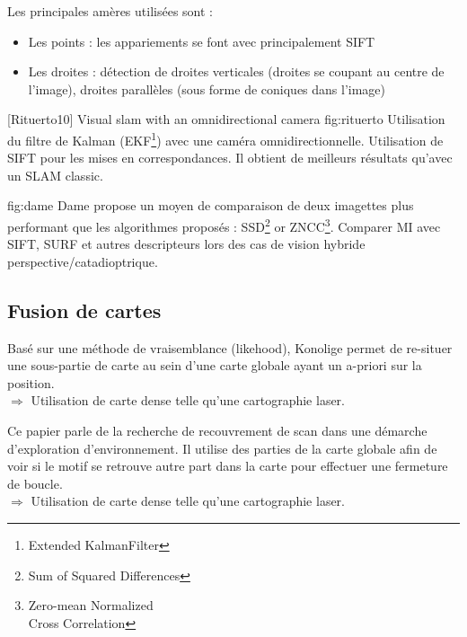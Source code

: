 
Les principales amères utilisées sont :
\begin{itemize}
\item Les points : les appariements se font avec principalement SIFT
\item Les droites : détection de droites verticales (droites se coupant au centre de l'image), droites parallèles (sous forme de coniques dans l'image)
\end{itemize}



 {[Rituerto10] Visual slam with an omnidirectional camera} {fig:rituerto}
Utilisation du filtre de Kalman (EKF\footnote{Extended KalmanFilter}) avec une caméra omnidirectionnelle. Utilisation de SIFT pour les mises en correspondances. Il obtient de meilleurs résultats qu'avec un SLAM classic. 



 {fig:dame}
Dame propose un moyen de comparaison de deux imagettes plus performant que les algorithmes proposés : SSD\footnote{Sum of Squared Differences} or ZNCC\footnote{Zero-mean Normalized\\Cross Correlation}.
Comparer MI avec SIFT, SURF et autres descripteurs lors des cas de vision hybride perspective/catadioptrique.  

\subsection{Fusion de cartes}

Basé sur une méthode de vraisemblance (likehood), Konolige permet de re-situer une sous-partie de carte au sein d'une carte globale ayant un a-priori sur la position.\\
$\Rightarrow$ Utilisation de carte dense telle qu'une cartographie laser.




Ce papier parle de la recherche de recouvrement de scan dans une démarche d'exploration d'environnement. 
Il utilise des parties de la carte globale afin de voir si le motif se retrouve autre part dans la carte pour effectuer une fermeture de boucle.\\
$\Rightarrow$ Utilisation de carte dense telle qu'une cartographie laser.




